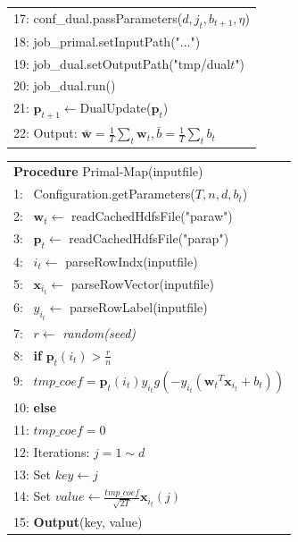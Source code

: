 \documentclass{llncs}
\newcommand{\bw}{\mathbf{w}}
\newcommand{\bp}{\mathbf{p}}
\newcommand{\lc}{\left(}
\newcommand{\rc}{\right)}
\newcommand{\tspace}{\hspace*{2em}}
\newcommand{\tspaces}{\hspace*{1.5em}}
\begin{document}
\begin{table}[ht]
\begin{tabular}{l}
    17: \tspaces conf\_dual.passParameters($d, j_t, b_{t+1}, \eta$) \\
    18: \tspaces job\_primal.setInputPath("...") \\	
    19:	\tspaces job\_dual.setOutputPath("tmp/dual$t$") \\
    20: \tspaces job\_dual.run() \\	
    21: \tspaces $\bp_{t+1}$$\leftarrow$DualUpdate($\bp_t$) \\
    22: Output: $\bar{\bw}=\frac{1}{T}\sum_{t}{\bw}_{t},\bar{b}=\frac{1}{T}\sum_{t}{b}_{t}$ \\
	\hline
	\end{tabular}
	\end{table}

    \begin{table}[ht]
	\begin{tabular}{l}
	\hline\noalign{\smallskip}
	\textbf{Procedure} Primal-Map(inputfile) \\
	\noalign{\smallskip}
	\hline
	\noalign{\smallskip}
    1:  ~Configuration.getParameters($T, n, d, b_t$) \\
    2:  ~$\bw_t \leftarrow$ readCachedHdfsFile("paraw") \\
    3:  ~$\bp_t \leftarrow$ readCachedHdfsFile("parap") \\
    4:  ~$i_t \leftarrow$ parseRowIndx(inputfile)\\
    5:  ~$\mathbf{x}_{i_t} \leftarrow$ parseRowVector(inputfile) \\
    6:  ~$y_{i_t} \leftarrow$ parseRowLabel(inputfile) \\
    7:  ~$r \leftarrow$ \textit{random(seed)} \\
    8:  ~\textbf{if} $\bp_t(i_t) > \frac{r}{n}$ \\
    9:  ~\tspace $tmp\_coef=\bp_t(i_t){y}_{{i}_{t}}g\lc-{y}_{{i}_{t}}\lc {{\bw}_{t}}^{T}{\mathbf{x}}_{i_t}+{b}_{t} \rc\rc$ \\
    10: \textbf{else} \\
    11: \tspace $tmp\_coef=0$ \\
    12: Iterations: $j=1 \sim d$ \\
    13: \tspace Set $key \leftarrow j$ \\
    14: \tspace Set $value \leftarrow \frac{tmp\_coef}{\sqrt{2T}}\mathbf{x}_{i_t}(j) $ \\
    15: \tspace \textbf{Output}(key, value) \\
	\hline
	\end{tabular}
	\end{table}
\end{document}
